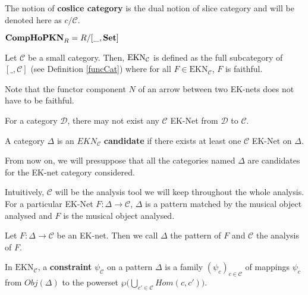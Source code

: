 \begin{defn}
    The notion of \textbf{coslice category} is the dual notion of slice category and will be denoted here as $c/\mathcal{C}$.
\end{defn}

\begin{rem}
    $\textbf{CompHoPKN}_R  = R/[\_,\bf Set]$
\end{rem}

\begin{defn}
    Let $\mathcal{C}$ be a small category. Then, $\bf \text{EKN}_\mathcal{C}$ is defined as the full subcategory of $[\_,\mathcal{C}]$ (see Definition \ref{funcCat}) where for all $F\in \text{EKN}_\mathcal{C}$, $F$ is faithful.
\end{defn}

\begin{rem}
    Note that the functor component $N$ of an arrow between two EK-nets does not have to be faithful.
\end{rem}

For a category $\mathcal{D}$, there may not exist any $\mathcal{C}$ EK-Net from $\mathcal{D}$ to $\mathcal{C}$.
\begin{defn}[EK candidate]
    A category $\Delta$ is an $EKN_{\mathcal{C}}$ \textbf{candidate} if there exists at least one $\mathcal{C}$ EK-Net on $\Delta$.
\end{defn}

\begin{note}
    From now on, we will presuppose that all the categories named $\Delta$ are candidates for the EK-net category considered.
\end{note}

Intuitively, $\mathcal{C}$ will be the analysis tool we will keep throughout the whole analysis. For a particular EK-Net $F : \Delta \rightarrow \mathcal{C}$, $\Delta$ is a pattern matched by the musical object analysed and $F$ is the musical object analysed.

Let $F : \Delta \rightarrow \mathcal{C}$ be an EK-net. Then we call $\Delta$ the pattern of $F$ and $\mathcal{C}$ the analysis of $F$.

\begin{defn}[Constraint]
    In $\text{EKN}_\mathcal{C}$, a \textbf{constraint} $\psi_\mathcal{C}$ on a pattern $\Delta$ is a family $(\psi_c)_{c\in\mathcal{C}}$ of mappings $\psi_c$ from $Obj(\Delta)$ to the powerset $\wp\big(\bigcup_{c'\in\mathcal{C}}Hom(c,c')\big)$.
\end{defn}


